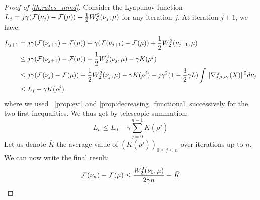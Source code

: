 \begin{proof}[Proof of \cref{th:rates_mmd}]\label{proof:th:rates_mmd}
	Consider the Lyapunov function $L_j = j \gamma ({{\mathcal F}}(\nu_j) - {{\mathcal F}}(\mu)) + \frac12 W_2^2(\nu_j,\mu)$ for any iteration $j$. At iteration $j+1$, we have:
	\begin{align*}
	L_{j+1} &= j\gamma({{\mathcal F}}(\nu_{j+1}) - {{\mathcal F}}(\mu)) + \gamma({{\mathcal F}}(\nu_{j+1}) - {{\mathcal F}}(\mu)) + \frac12 W_2^2(\nu_{j+1},\mu)\\
	&\leq j\gamma({{\mathcal F}}(\nu_{j+1}) - {{\mathcal F}}(\mu)) + \frac12 W_2^2(\nu_j,\mu)-\gamma K(\rho^j)\\
	&\leq j\gamma({{\mathcal F}}(\nu_{j}) - {{\mathcal F}}(\mu)) + \frac12 W_2^2(\nu_j,\mu)-\gamma K(\rho^j) -j\gamma^2 (1-\frac{3}{2} \gamma L )\int \Vert \nabla f_{\mu, \nu_j}(X)\Vert^2 d\nu_j \\
	&\leq  L_j - \gamma K(\rho^j).
	\end{align*}
	where we used ~\cref{prop:evi} and \cref{prop:decreasing_functional} successively for the two first inequalities. We thus get by telescopic summation: 
	\begin{equation}
	 L_n \leq L_0 -\gamma \sum_{j = 0}^{n-1} K(\rho^j)
	\end{equation}
		Let us denote $\bar{K}$ the average value of $(K(\rho^j))_{0\leq j \leq n}$ over iterations up to $n$. We can now write the final result:
	\begin{equation}
	{{\mathcal F}}(\nu_{n}) - {{\mathcal F}}(\mu) \leq \frac{W_2^2(\nu_0, \mu)}{2 \gamma n} -\bar{K}
	\end{equation}
\end{proof}






